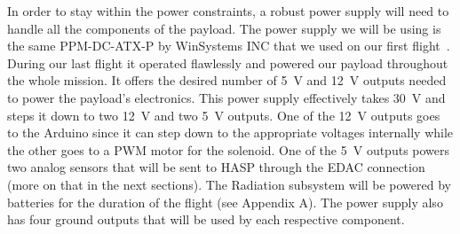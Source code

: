 In order to stay within the power constraints, a robust power supply will need to  handle all the components of the payload.  The power supply we will be using is the same PPM-DC-ATX-P by WinSystems INC that we used on our first flight~\cite{SORA}.  During our last flight it operated flawlessly and powered our payload throughout the whole mission.  It offers the desired number of \SI{+5}{\volt} and \SI{+12}{\volt} outputs needed to power the payload's electronics.  This power supply effectively takes \SI{+30}{\volt} and steps it down to two \SI{+12}{\volt} and two \SI{+5 }{\volt} outputs.  One of the \SI{+12}{\volt} outputs goes to the Arduino since it can step down to the appropriate voltages internally while the other goes to a PWM motor for the solenoid.  One of the \SI{+5 }{\volt} outputs powers two analog sensors that will be sent to HASP through the EDAC connection (more on that in the next sections).  The Radiation subsystem will be powered by batteries for the duration of the flight (see Appendix A).  The power supply also has four ground outputs that will be used by each respective component. 
